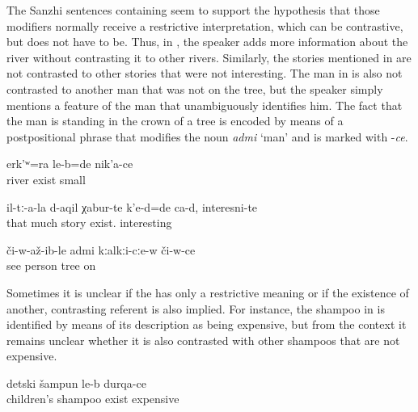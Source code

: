 The Sanzhi sentences containing  seem to support the hypothesis that those modifiers normally receive a restrictive interpretation, which can be contrastive, but does not have to be. Thus, in , the speaker adds more information about the river without contrasting it to other rivers. Similarly, the stories mentioned in  are not contrasted to other stories that were not interesting. The man in  is also not contrasted to another man that was not on the tree, but the speaker simply mentions a feature of the man that unambiguously identifies him. The fact that the man is standing in the crown of a tree is encoded by means of a postpositional phrase that modifies the noun \textit{admi} `man' and is marked with -\textit{ce}.

\begin{exe}
	\ex	\label{ex:‎There was also a river there that was small}
	\gll	erk'ʷ=ra	le-b=de	nik'a-ce\\
		river	exist	small\\
	\glt	{}

	\ex	\label{ex:About them there were, are many stories, interesting@19c}
	\gll	il-tː-a-la	d-aqil	χabur-te	k'e-d=de	ca-d,	interesni-te\\
		that	much	story	exist.		interesting\\
	\glt	{}

	\ex	\label{ex:and then (he) saw the man on the tree@19c}
	\gll	či-w-až-ib-le admi	kːalkːi-cːe-w	či-w-ce\\
		see	person	tree	on\\
	\glt	{}
\end{exe}

Sometimes it is unclear if the  has only a restrictive meaning or if the existence of another, contrasting referent is also implied. For instance, the shampoo in  is identified by means of its description as being expensive, but from the context it remains unclear whether it is also contrasted with other shampoos that are not expensive.
%
\begin{exe}

		\ex	\label{ex:There is shampoo for children, expensive@19c}
		\gll	detski	šampun	le-b	durqa-ce\\
			children's	shampoo	exist	expensive\\
		\glt	{}
\end{exe}


